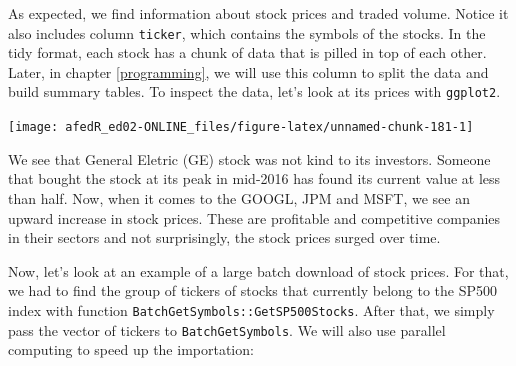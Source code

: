 \documentclass[
  12pt,
]{book}
\begin{document}
As expected, we find information about stock prices and traded volume. Notice it also includes column \texttt{ticker}, which contains the symbols of the stocks. In the tidy format, each stock has a chunk of data that is pilled in top of each other. Later, in chapter \ref{programming}, we will use this column to split the data and build summary tables. To inspect the data, let's look at its prices with \texttt{ggplot2}.

\begin{center}\texttt{[image: afedR\_ed02-ONLINE\_files/figure-latex/unnamed-chunk-181-1]} \end{center}

We see that General Eletric (GE) stock was not kind to its investors. Someone that bought the stock at its peak in mid-2016 has found its current value at less than half. Now, when it comes to the GOOGL, JPM and MSFT, we see an upward increase in stock prices. These are profitable and competitive companies in their sectors and not surprisingly, the stock prices surged over time.

Now, let's look at an example of a large batch download of stock prices. For that, we had to find the group of tickers of stocks that currently belong to the SP500 index with function \texttt{BatchGetSymbols::GetSP500Stocks}. After that, we simply pass the vector of tickers to \texttt{BatchGetSymbols}. We will also use parallel computing to speed up the importation:
\end{document}
